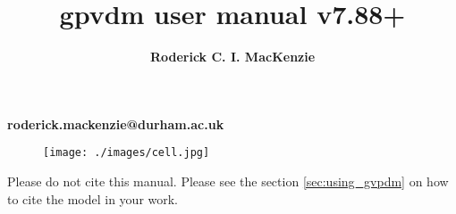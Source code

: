 \title{\Huge \textbf{gpvdm user manual v7.88+}}

\author{\textbf{Roderick C. I. MacKenzie}}


\maketitle



\setcounter{question}{0}



\centerline{\textbf{roderick.mackenzie@durham.ac.uk}}



\begin{figure}[ht!]
\centering
\texttt{[image: ./images/cell.jpg]}
\label{overflow}
\end{figure}

\newpage


\vspace*{\fill}
Please do not cite this manual.  Please see the section \ref{sec:using_gvpdm} on how to cite the model in your work.
\vspace*{\fill}


